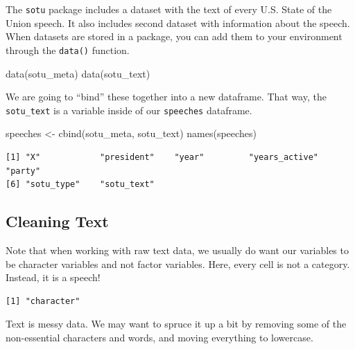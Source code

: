 \documentclass[
  letterpaper,
  DIV=11,
  numbers=noendperiod]{scrreprt}
\newenvironment{Shaded}{\begin{snugshade}}{\end{snugshade}}
\newcommand{\FunctionTok}[1]{\textcolor[rgb]{0.28,0.35,0.67}{#1}}
\newcommand{\NormalTok}[1]{\textcolor[rgb]{0.00,0.23,0.31}{#1}}
\newcommand{\OtherTok}[1]{\textcolor[rgb]{0.00,0.23,0.31}{#1}}
\newcommand{\SpecialCharTok}[1]{\textcolor[rgb]{0.37,0.37,0.37}{#1}}
\begin{document}
The \texttt{sotu} package includes a dataset with the text of every U.S.
State of the Union speech. It also includes second dataset with
information about the speech. When datasets are stored in a package, you
can add them to your environment through the \texttt{data()} function.

\begin{Shaded}
\begin{Highlighting}[]
\FunctionTok{data}\NormalTok{(sotu\_meta)}
\FunctionTok{data}\NormalTok{(sotu\_text)}
\end{Highlighting}
\end{Shaded}

We are going to ``bind'' these together into a new dataframe. That way,
the \texttt{sotu\_text} is a variable inside of our \texttt{speeches}
dataframe.

\begin{Shaded}
\begin{Highlighting}[]
\NormalTok{speeches }\OtherTok{\textless{}{-}} \FunctionTok{cbind}\NormalTok{(sotu\_meta, sotu\_text)}
\FunctionTok{names}\NormalTok{(speeches)}
\end{Highlighting}
\end{Shaded}

\begin{verbatim}
[1] "X"            "president"    "year"         "years_active" "party"       
[6] "sotu_type"    "sotu_text"   
\end{verbatim}

\hypertarget{cleaning-text}{%
\subsection{Cleaning Text}\label{cleaning-text}}

Note that when working with raw text data, we usually do want our
variables to be character variables and not factor variables. Here,
every cell is not a category. Instead, it is a speech!

\begin{Shaded}
\end{Shaded}

\begin{verbatim}
[1] "character"
\end{verbatim}

Text is messy data. We may want to spruce it up a bit by removing some
of the non-essential characters and words, and moving everything to
lowercase.
\end{document}
